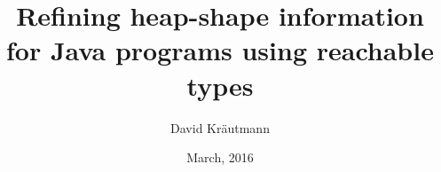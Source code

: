 
\title{Refining heap-shape information for Java programs using reachable types}

\author{David Kr\"{a}utmann}




\date{March, 2016}

